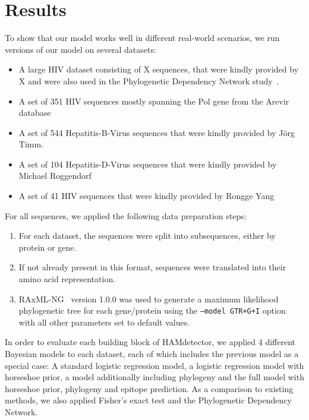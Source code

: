 \documentclass[fleqn,11pt]{SelfArx} %
\begin{document}
\section{Results}

To show that our model works well in different real-world scenarios, we run versions of our model on several datasets:

\begin{itemize}
  \item A large HIV dataset consisting of X sequences, that were kindly provided by X and were also used in the Phylogenetic Dependency Network study~\cite{Carlson2008}.
  \item A set of 351 HIV sequences mostly spanning the Pol gene from the Arevir database~\cite{Roomp2006}
  \item A set of 544 Hepatitis-B-Virus sequences that were kindly provided by Jörg Timm.
  \item A set of 104 Hepatitis-D-Virus sequences that were kindly provided by Michael Roggendorf
  \item A set of 41 HIV sequences that were kindly provided by Rongge Yang
\end{itemize}

For all sequences, we applied the following data preparation steps:

\begin{enumerate}
  \item For each dataset, the sequences were split into subsequences, either by protein or gene.
  \item If not already present in this format, sequences were translated into their amino acid representation.
  \item RAxML-NG~\cite{Kozlov2019} version 1.0.0 was used to generate a maximum likelihood phylogenetic tree for each gene/protein using the \texttt{--model GTR+G+I} option with all other parameters set to default values.
\end{enumerate}

In order to evaluate each building block of HAMdetector, we applied 4 different Bayesian models to each dataset, each of which includes the previous model as a special case:
A standard logistic regression model, a logistic regression model with horseshoe prior, a model additionally including phylogeny and the full model with horseshoe prior, phylogeny and epitope prediction.
As a comparison to existing methods, we also applied Fisher's exact test and the Phylogenetic Dependency Network.
\end{document}
